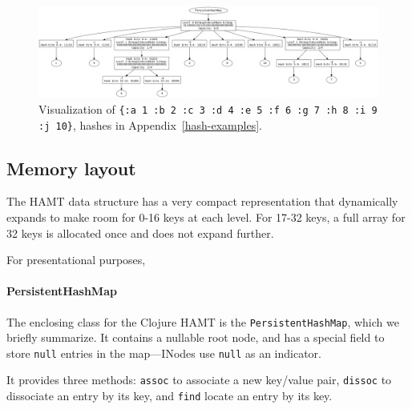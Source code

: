 \documentclass[preprint]{sigplanconf}
\begin{document}
\begin{figure}
\includegraphics[width=18cm]{big-tree}
\caption{
Visualization of
\texttt{\{:a 1 :b 2 :c 3 :d 4 :e 5 :f 6 :g 7 :h 8 :i 9 :j 10\}},
hashes in Appendix~\ref{hash-examples}.
}
\label{big-trie-vis}
\end{figure}

\subsection{Memory layout}

The HAMT data structure has a very compact representation
that dynamically expands to make room for 0-16 keys
at each level. For 17-32 keys, a full array for 32 keys
is allocated once and does not expand further.

For presentational purposes, 

\paragraph{PersistentHashMap}

The enclosing class for the Clojure HAMT
is the \texttt{PersistentHashMap},
which we briefly summarize.
It contains a nullable root node,
and has a special field to store
\texttt{null} entries in the map---INodes
use \texttt{null} as an indicator.

It provides three methods: 
\texttt{assoc} to associate a new key/value pair, 
\texttt{dissoc} to dissociate an entry by its key, 
and \texttt{find} locate an entry by its key.

\end{document}
